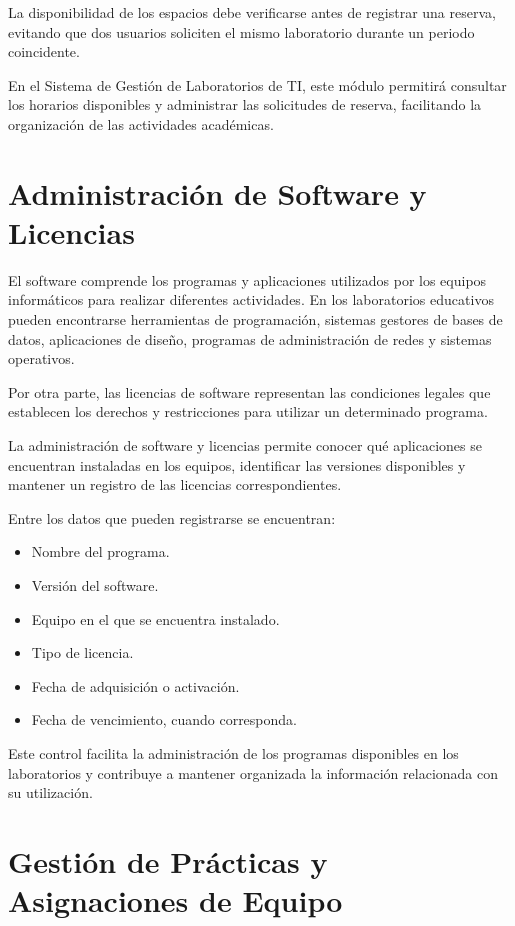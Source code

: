 La disponibilidad de los espacios debe verificarse antes de registrar una reserva, evitando que dos usuarios soliciten el mismo laboratorio durante un periodo coincidente.

En el Sistema de Gestión de Laboratorios de TI, este módulo permitirá consultar los horarios disponibles y administrar las solicitudes de reserva, facilitando la organización de las actividades académicas.

\section{Administración de Software y Licencias}

El software comprende los programas y aplicaciones utilizados por los equipos informáticos para realizar diferentes actividades. En los laboratorios educativos pueden encontrarse herramientas de programación, sistemas gestores de bases de datos, aplicaciones de diseño, programas de administración de redes y sistemas operativos.

Por otra parte, las licencias de software representan las condiciones legales que establecen los derechos y restricciones para utilizar un determinado programa.

La administración de software y licencias permite conocer qué aplicaciones se encuentran instaladas en los equipos, identificar las versiones disponibles y mantener un registro de las licencias correspondientes.

Entre los datos que pueden registrarse se encuentran:

\begin{itemize}

    \item Nombre del programa.
    \item Versión del software.
    \item Equipo en el que se encuentra instalado.
    \item Tipo de licencia.
    \item Fecha de adquisición o activación.
    \item Fecha de vencimiento, cuando corresponda.

\end{itemize}

Este control facilita la administración de los programas disponibles en los laboratorios y contribuye a mantener organizada la información relacionada con su utilización.

\section{Gestión de Prácticas y Asignaciones de Equipo}

